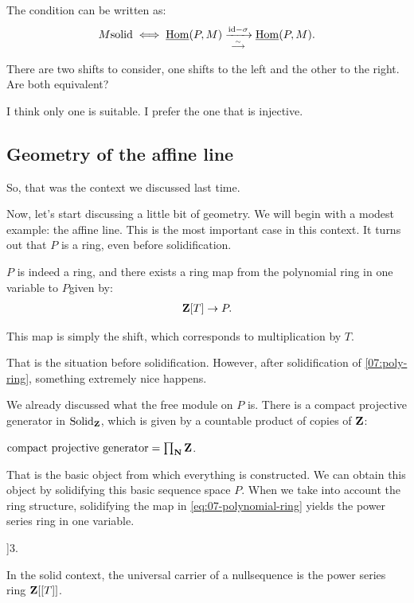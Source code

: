 The condition can be written as:
\begin{align*}
M \text{solid} \iff \operatorname{\underline{Hom}}(P,M) \xrightarrow[\overset\sim\longrightarrow]{\mathrm{id} - \sigma} \operatorname{\underline{Hom}}(P,M).
\end{align*}

\ques There are two shifts to consider, one shifts to the left and the other to the right. Are both equivalent? 

\ans I think only one is suitable. I prefer the one that is injective.

\subsection{Geometry of the affine line}

So, that was the context we discussed last time.

Now, let's start discussing a little bit of geometry. We will begin with a modest example: the affine line. This is the most important case in this context. It turns out that $P$ is a ring, even before solidification.

$P$ is indeed a ring, and there exists a ring map from the polynomial ring in one variable to $P$given by:
\begin{align*} \label{eq:07-polynomial-ring}
\mathbf Z[T] \to P.
\end{align*}

This map is simply the shift, which corresponds to multiplication by $T$.

That is the situation before solidification. However, after solidification of \ref{07:poly-ring}, something extremely nice happens.

We already discussed what the free module on $P$ is. There is a compact projective generator in $\mathrm{Solid}_\mathbf Z$, which is given by a countable product of copies of $\mathbf Z$:

$\text{compact projective generator} = \prod_\mathbf N \mathbf Z$.

That is the basic object from which everything is constructed. We can obtain this object by solidifying this basic sequence space $P$. 
When we take into account the ring structure, solidifying the map in \ref{eq:07-polynomial-ring} yields the power series ring in one variable.

\be \label{eq:07-power-series-ring}
\Z[T] \to \Z[[T]]3.
\ee
{}

In the solid context, the universal carrier of a nullsequence is the power series ring $\mathbf Z[[T]]$.

